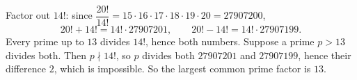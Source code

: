 Factor out $14!$: since $\dfrac{20!}{14!}=15\cdot16\cdot17\cdot18\cdot19\cdot20=27907200$,
\[
20!+14!=14!\cdot27907201,\qquad 20!-14!=14!\cdot27907199 .
\]
Every prime up to $13$ divides $14!$, hence both numbers. Suppose a prime $p>13$ divides both. Then $p\nmid14!$, so $p$ divides both $27907201$ and $27907199$, hence their difference $2$, which is impossible. So the largest common prime factor is $\boxed{13}$.
